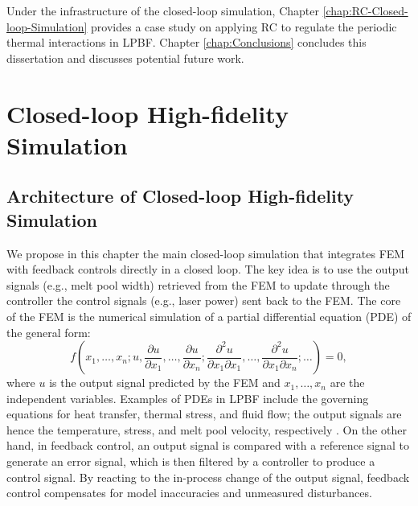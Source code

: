 \documentclass [11pt, proquest] {uwthesis}[2020/02/24]
\begin{document}
Under the infrastructure of the closed-loop simulation, Chapter \ref{chap:RC-Closed-loop-Simulation} provides a case study on applying RC to regulate the periodic thermal interactions in LPBF. Chapter \ref{chap:Conclusions} concludes this dissertation and discusses potential future work.


\part{Closed-loop High-fidelity Simulation} \label{part:Closed-loop-Simulation}


\chapter{Architecture of Closed-loop High-fidelity Simulation} \label{chap:Closed-loop-Simulation}

We propose in this chapter the main closed-loop simulation that integrates
FEM with feedback controls directly in a closed loop. The key idea
is to use the output signals (e.g., melt pool width) retrieved from
the FEM to update through the controller the control signals (e.g.,
laser power) sent back to the FEM. The core of the FEM is the numerical
simulation of a partial differential equation (PDE) of the general
form:
\[
f(x_{1},\ldots,x_{n};u,\frac{\partial u}{\partial x_{1}},\ldots,\frac{\partial u}{\partial x_{n}};\frac{\partial^{2}u}{\partial x_{1}\partial x_{1}},\ldots,\frac{\partial^{2}u}{\partial x_{1}\partial x_{n}};\ldots)=0,
\]
where $u$ is the output signal predicted by the FEM and $x_{1},\ldots,x_{n}$
are the independent variables. Examples of PDEs in LPBF include the
governing equations for heat transfer, thermal stress, and fluid flow;
the output signals are hence the temperature, stress, and melt pool
velocity, respectively \cite{luo2018survey,mukherjee2018heat}. On
the other hand, in feedback control, an output signal is compared
with a reference signal to generate an error signal, which is then
filtered by a controller to produce a control signal. By reacting
to the in-process change of the output signal, feedback control compensates
for model inaccuracies and unmeasured disturbances.
\end{document}
